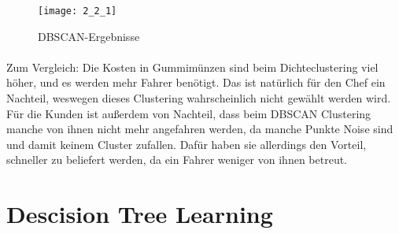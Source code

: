 \documentclass[a4paper]{article}
\begin{document}
\begin{figure}[h]
\caption{DBSCAN-Ergebnisse}
\texttt{[image: 2\_2\_1]}
\end{figure}

\paragraph{}
Zum Vergleich: Die Kosten in Gummimünzen sind beim Dichteclustering viel höher, und es werden mehr Fahrer benötigt. Das ist natürlich für den Chef ein Nachteil, weswegen dieses Clustering wahrscheinlich nicht gewählt werden wird.
Für die Kunden ist außerdem von Nachteil, dass beim DBSCAN Clustering manche von ihnen nicht mehr angefahren werden, da manche Punkte Noise sind und damit keinem Cluster zufallen. Dafür haben sie allerdings den Vorteil, schneller zu beliefert werden, da ein Fahrer weniger von ihnen betreut.

\section{Descision Tree Learning}
\end{document}
